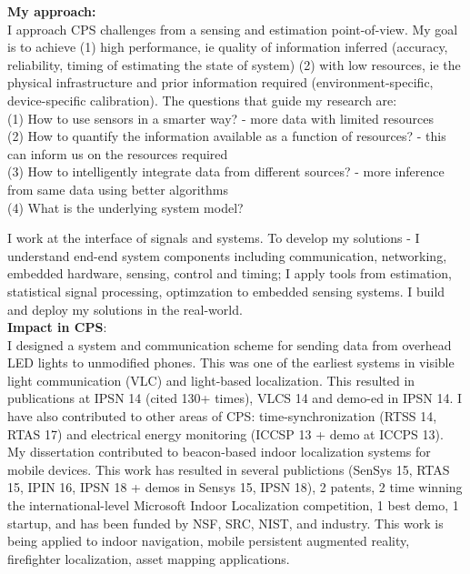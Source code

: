 \documentclass[10pt]{article}
\begin{document}
\textbf{My approach:}\\
I approach CPS challenges from a sensing and estimation point-of-view. My goal is to achieve (1) high performance, ie quality of information inferred (accuracy, reliability, timing of estimating the state of system) (2) with low resources, ie the physical infrastructure and prior information required (environment-specific, device-specific calibration). %
The questions that guide my research are:\\
(1) How to use sensors in a smarter way? - more data with limited resources\\
(2) How to quantify the information available as a function of resources? - this can inform us on the resources required\\
(3) How to intelligently integrate data from different sources? - more inference from same data using better algorithms\\
(4) What is the underlying system model?

I work at the interface of signals and systems. To develop my solutions - I understand end-end system components including communication, networking, embedded hardware, sensing, control and timing; I apply tools from estimation, statistical signal processing, optimzation to embedded sensing systems. I build and deploy my solutions in the real-world. \\ 

\textbf{Impact in CPS}:\\
I designed a system and communication scheme for sending data from overhead LED lights to unmodified phones. This was one of the earliest systems in visible light communication (VLC) and light-based localization. This resulted in publications at IPSN 14 (cited 130+ times), VLCS 14 and demo-ed in IPSN 14. %
I have also contributed to other areas of CPS: time-synchronization (RTSS 14, RTAS 17) and electrical energy monitoring (ICCSP 13 + demo at ICCPS 13). My dissertation contributed to beacon-based indoor localization systems for mobile devices. This work has resulted in several publictions (SenSys 15, RTAS 15, IPIN 16, IPSN 18 + demos in Sensys 15, IPSN 18), 2 patents, 2 time winning the international-level Microsoft Indoor Localization competition, 1 best demo, 1 startup, and has been funded by NSF, SRC, NIST, and industry. This work is being applied to indoor navigation, mobile persistent augmented reality, firefighter localization, asset mapping applications. 
\end{document}
